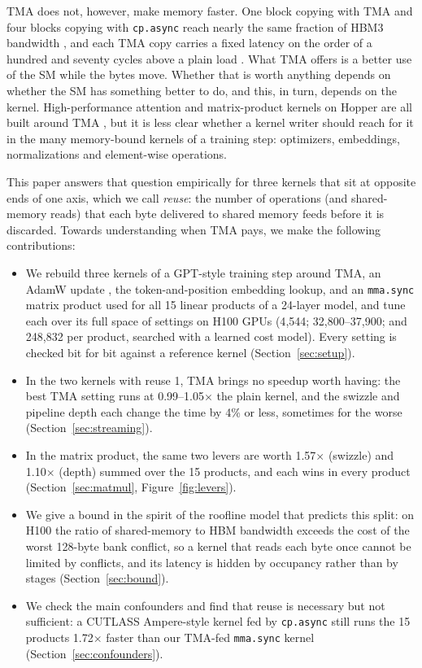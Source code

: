 \documentclass[10pt]{article}
\newcommand{\x}{\ensuremath{\times}}
\begin{document}
TMA does not, however, make memory faster. One block copying with TMA and four blocks copying with \texttt{cp.async} reach
nearly the same fraction of HBM3 bandwidth \citep{bose2026tma}, and each TMA copy carries a fixed latency on the order of a
hundred and seventy cycles above a plain load \citep{luo2025dissecting}. What TMA offers is a better use of the SM while the
bytes move. Whether that is worth anything depends on whether the SM has something better to do, and this, in turn, depends
on the kernel. High-performance attention and matrix-product kernels on Hopper are all built around TMA
\citep{shah2024flashattention3, spector2024thunderkittens, shankhdhar2024worklog}, but it is less clear whether a kernel
writer should reach for it in the many memory-bound kernels of a training step: optimizers, embeddings, normalizations
and element-wise operations.

This paper answers that question empirically for three kernels that sit at opposite ends of one axis, which we call
\emph{reuse}: the number of operations (and shared-memory reads) that each byte delivered to shared memory feeds before it
is discarded. Towards understanding when TMA pays, we make the following contributions:

\begin{itemize}
  \item We rebuild three kernels of a GPT-style training step around TMA, an AdamW update
        \citep{kingma2015adam, loshchilov2019adamw}, the token-and-position embedding lookup, and an \texttt{mma.sync}
        matrix product used for all 15 linear products of a 24-layer model, and tune each over its full space of settings
        on H100 GPUs (4{,}544; 32{,}800--37{,}900; and 248{,}832 per product, searched with a learned cost model). Every
        setting is checked bit for bit against a reference kernel (Section~\ref{sec:setup}).
  \item In the two kernels with reuse 1, TMA brings no speedup worth having: the best TMA setting runs at 0.99--1.05\x{}
        the plain kernel, and the swizzle and pipeline depth each change the time by 4\% or less, sometimes for the worse
        (Section~\ref{sec:streaming}).
  \item In the matrix product, the same two levers are worth 1.57\x{} (swizzle) and 1.10\x{} (depth) summed over the 15
        products, and each wins in every product (Section~\ref{sec:matmul}, Figure~\ref{fig:levers}).
  \item We give a bound in the spirit of the roofline model \citep{williams2009roofline} that predicts this split: on
        H100 the ratio of shared-memory to HBM bandwidth exceeds the cost of the worst 128-byte bank conflict, so a
        kernel that reads each byte once cannot be limited by conflicts, and its latency is hidden by occupancy rather than
        by stages (Section~\ref{sec:bound}).
  \item We check the main confounders and find that reuse is necessary but not sufficient: a CUTLASS Ampere-style kernel
        fed by \texttt{cp.async} still runs the 15 products 1.72\x{} faster than our TMA-fed \texttt{mma.sync} kernel
        (Section~\ref{sec:confounders}).
\end{itemize}
\end{document}

